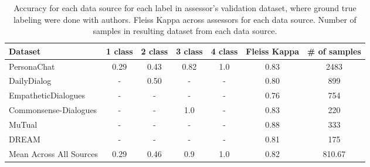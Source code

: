 \documentclass[11pt]{article}
\begin{document}
\begin{table}[t]
\begin{center}
\tabcolsep=0.11cm
\begin{tabular}{l|cccc|c|c}
\hline
Dataset &    1 class &     2 class &     3 class &    4 class & Fleiss Kappa & \# of samples\\
\hline
PersonaChat         &  0.29 &  0.43 &  0.82 &  1.0 & 0.83 & 2483  \\
DailyDialog        & - &  0.50 & - & - & 0.80 & 899 \\
EmpatheticDialogues   & - & - & - & - & 0.76 & 754 \\
Commonsense-Dialogues & - & - &  1.0 & - & 0.83 & 220\\
MuTual        & - & - & - & - & 0.88 & 333\\
DREAM        & - & - & - & - & 0.81 & 175 \\
\hline
Mean Across All Sources & 0.29 & 0.46 & 0.9 & 1.0 & 0.82 & 810.67 \\
\hline
\end{tabular}
\end{center}
\caption{Accuracy for each data source for each label in assessor's validation dataset, where ground true labeling were done with authors. Fleiss Kappa across assessors for each data source. Number of samples in resulting dataset from each data source.}
\label{TableAccuracies} 
\end{table}
\end{document}
